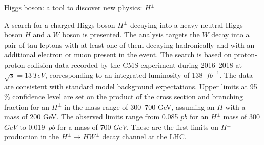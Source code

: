 \begin{MyArticle}[enhanced, tikz={rotate=0}]{Higgs boson: a tool to
    discover new physics: $H^{\pm}$}
  \begin{multicols}{2}
  A search for a charged Higgs boson $H^{\pm}$ decaying
  into a heavy neutral Higgs boson $H$ and a $W$ boson
  is presented. The analysis targets the $W$ decay into a pair
  of tau leptons with at least one of them decaying hadronically and
  with an additional electron or muon present in the event.
  The search is based on proton-proton collision data
  recorded by the CMS experiment during 2016--2018 at
  $\sqrt{s} = 13~TeV$, corresponding to an integrated
  luminosity of 138~$fb^{-1}$. The data are consistent with
  standard model background expectations. Upper limits at 95$\%$ confidence
  level are set on the product of the cross section and branching fraction
  for an $H^{\pm}$ in the mass range of 300--700 GeV, assuming an $H$ 
  with a mass of 200 GeV. The observed limits range from
  0.085 $pb$ for an $H^{\pm}$ mass of
  300 $GeV$ to 0.019~$pb$ for a mass of
  700 $GeV$. These are the first limits on $H^{\pm}$
  production in the $H^{\pm} \to H W^{\pm}$ decay channel at the LHC. 
  \end{multicols}
\end{MyArticle}
